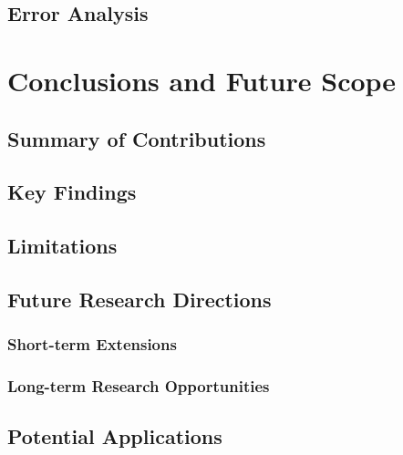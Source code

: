 \documentclass[12pt,a4paper]{report}
\begin{document}
\section{Error Analysis}


\chapter{Conclusions and Future Scope}
\label{chap:conclusions}

\section{Summary of Contributions}


\section{Key Findings}


\section{Limitations}


\section{Future Research Directions}


\subsection{Short-term Extensions}


\subsection{Long-term Research Opportunities}


\section{Potential Applications}







\appendix
\end{document}
